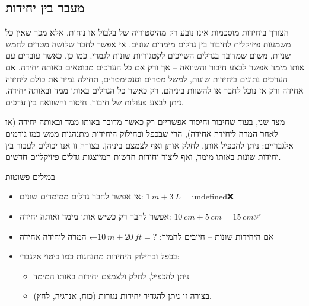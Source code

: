 \documentclass[
  hebrew,
  letterpaper,
  DIV=11,
  numbers=noendperiod]{scrreprt}
\providecommand{\tightlist}{%
  \setlength{\itemsep}{0pt}\setlength{\parskip}{0pt}}
\begin{document}
\subsection{\texorpdfstring{{מעבר בין
יחידות}}{מעבר בין יחידות}}\label{ux5deux5e2ux5d1ux5e8-ux5d1ux5d9ux5df-ux5d9ux5d7ux5d9ux5d3ux5d5ux5ea}

{הצורך ביחידות מוסכמות אינו נובע רק מהיסטוריה של בלבול או נוחות, אלא מכך
שאין כל משמעות פיזיקלית לחיבור בין גדלים מימדים שונים}. {אי אפשר לחבר
שלושה מטרים לחמש שניות, משום שמדובר בגדלים השייכים לקטגוריות שונות
לגמרי. כמו כן, כאשר עובדים עם אותו מימד אפשר לבצע חיבור והשוואה -- אך
ורק אם כל הערכים מבוטאים באותה יחידה. אם הערכים נתונים ביחידות שונות,
למשל מטרים וסנטימטרים, תחילה נמיר את כולם ליחידה אחידה ורק אז נוכל לחבר
או להשוות ביניהם. רק כאשר כל הגדלים באותו ממד ובאותה יחידה, ניתן לבצע
פעולות של חיבור, חיסור והשוואה בין ערכים.}

{מצד שני, בעוד שחיבור וחיסור אפשריים רק כאשר מדובר באותו ממד ובאותה
יחידה (או לאחר המרה ליחידה אחידה), הרי שבכפל ובחילוק היחידות מתנהגות ממש
כמו גורמים אלגבריים: ניתן להכפיל אותן, לחלק אותן ואף לצמצם ביניהן}.
{בצורה זו אנו יכולים לעבור בין יחידות שונות באותו מימד, ואף ליצור יחידות
חדשות המייצגות גדלים פיזיקליים חדשים.}

{במילים פשוטות}

\begin{tcolorbox}[enhanced jigsaw, colback=white, arc=.35mm, coltitle=black, breakable, toptitle=1mm, leftrule=.75mm, colbacktitle=quarto-callout-tip-color!10!white, opacitybacktitle=0.6, bottomtitle=1mm, titlerule=0mm, opacityback=0, colframe=quarto-callout-tip-color-frame, title=\textcolor{quarto-callout-tip-color}{\faLightbulb}\hspace{0.5em}{עצה}, rightrule=.15mm, bottomrule=.15mm, toprule=.15mm, left=2mm]

\begin{itemize}
\tightlist
\item
  {אי אפשר לחבר גדלים ממימדים שונים:}
  \(1\text{ }m + 3\text{ }L = \text{undefined}\)❌
\item
  {אפשר לחבר רק כשיש אותו מימד ואותה יחידה:}
  \(10\text{ }cm + 5\text{ }cm = 15\text{ }cm\)✅
\item
  {אם היחידות שונות -- חייבים להמיר:}
  \(10\text{ }m + 20\text{ }ft = ?\){← המרה ליחידה אחידה}
\item
  {בכפל ובחילוק היחידות מתנהגות כמו ביטוי אלגברי:}

  \begin{itemize}
  \tightlist
  \item
    {ניתן להכפיל, לחלק ולצמצם יחידות} {באותו המימד}
  \item
    {בצורה זו ניתן להגדיר יחידות נגזרות (כוח, אנרגיה, לחץ).}
  \end{itemize}
\end{itemize}

\end{tcolorbox}
\end{document}
